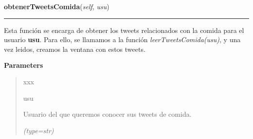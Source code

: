 \hspace{.8\funcindent}\begin{boxedminipage}{\funcwidth}

    \raggedright \textbf{obtenerTweetsComida}(\textit{self}, \textit{usu})

    \vspace{-1.5ex}

    \rule{\textwidth}{0.5\fboxrule}
\setlength{\parskip}{2ex}
    Esta función se encarga de obtener los tweets relacionados con la 
    comida para el usuario \textbf{usu}. Para ello, se llamamos a la 
    función \textit{leerTweetsComida(usu)}, y una vez leidos, creamos la 
    ventana con estos tweets.

\setlength{\parskip}{1ex}
      \textbf{Parameters}
      \vspace{-1ex}

      \begin{quote}
        \begin{Ventry}{xxx}

          \item[usu]

          Usuario del que queremos conocer sus tweets de comida.

            {\it (type=str)}

        \end{Ventry}

      \end{quote}

    \end{boxedminipage}

    \label{funcionesTwitter:FuncionesTwitter:leerTweetsComida}

    \vspace{0.5ex}

